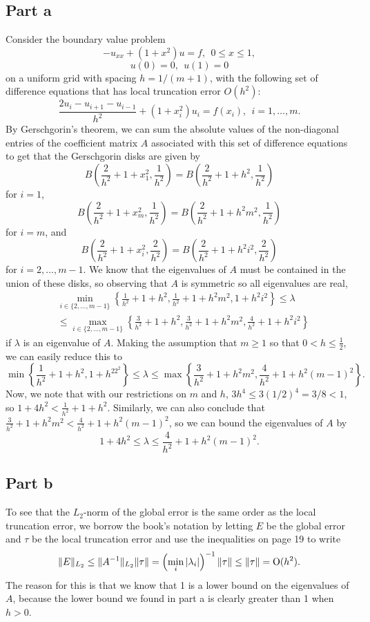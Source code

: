 \documentclass{article}
\begin{document}
	\subsection{Part a}
Consider the boundary value problem
\[
- u_{xx} + ( 1 + x^2 ) u = f ,~~0 \leq x \leq 1 ,
\]
\[
u(0) = 0 ,~~u(1) = 0
\]
on a uniform grid with spacing $h = 1/(m+1)$, with the following set of difference equations
that has local truncation error $O( h^2 )$:
\[
\frac{2 u_i - u_{i+1} - u_{i-1}}{h^2} + (1 + x_i^2 ) u_i = f( x_i ) ,~~i=1, \ldots , m .
\]
By Gerschgorin's theorem, we can sum the absolute values of the non-diagonal entries of the coefficient matrix $A$ associated with this set of difference equations to get that the Gerschgorin disks are given by
\[
B\left(\frac{2}{h^2}+1+x_1^2,\frac{1}{h^2}\right)=B\left(\frac{2}{h^2}+1+h^2,\frac{1}{h^2}\right)
\]
for $i=1$,
\[
B\left(\frac{2}{h^2}+1+x_m^2,\frac{1}{h^2}\right)=B\left(\frac{2}{h^2}+1+h^2m^2,\frac{1}{h^2}\right)
\]
for $i=m$, and
\[
B\left(\frac{2}{h^2}+1+x_i^2,\frac{2}{h^2}\right)=B\left(\frac{2}{h^2}+1+h^2i^2,\frac{2}{h^2}\right)
\]
for $i=2,\ldots,m-1$. We know that the eigenvalues of $A$ must be contained in the union of these disks, so observing that $A$ is symmetric so all eigenvalues are real, 
\begin{align*}
&\min_{i\in\{2,\ldots,m-1\}}\left\{\frac{1}{h^2}+1+h^2,\frac{1}{h^2}+1+h^2m^2,1+h^2i^2\right\}\leq\lambda\\&\leq\max_{i\in\{2,\ldots,m-1\}}\left\{\frac{3}{h^2}+1+h^2,\frac{3}{h^2}+1+h^2m^2,\frac{4}{h^2}+1+h^2i^2\right\}
\end{align*}
if $\lambda$ is an eigenvalue of $A$. Making the assumption that $m\geq1$ so that $0<h\leq\frac{1}{2}$, we can easily reduce this to 
\[
\min\left\{\frac{1}{h^2}+1+h^2,1+h^22^2\right\}\leq\lambda\leq\max\left\{\frac{3}{h^2}+1+h^2m^2,\frac{4}{h^2}+1+h^2(m-1)^2\right\}.
\]
Now, we note that with our restrictions on $m$ and $h$, $3h^4\leq3(1/2)^4=3/8<1$, so $1+4h^2<\frac{1}{h^2}+1+h^2$. Similarly, we can also conclude that $\frac{3}{h^2}+1+h^2m^2<\frac{4}{h^2}+1+h^2(m-1)^2$, so we can bound the eigenvalues of $A$ by
\[
1+4h^2\leq\lambda\leq\frac{4}{h^2}+1+h^2(m-1)^2.
\]
	\subsection{Part b}
To see that the $L_2$-norm of the global error is the same order as the local truncation error, we borrow the book's notation by letting $E$ be the global error and $\tau$ be the local truncation error and use the inequalities on page 19 to write
\[
\|E\|_{L_2}\leq\|A^{-1}\|_{L_2}\|\tau\|=\left(\min_i|\lambda_i|\right)^{-1}\|\tau\|\leq\|\tau\|=\operatorname{O}(h^2).
\]
The reason for this is that we know that 1 is a lower bound on the eigenvalues of $A$, because the lower bound we found in part a is clearly greater than 1 when $h>0$.
	
\end{document}
